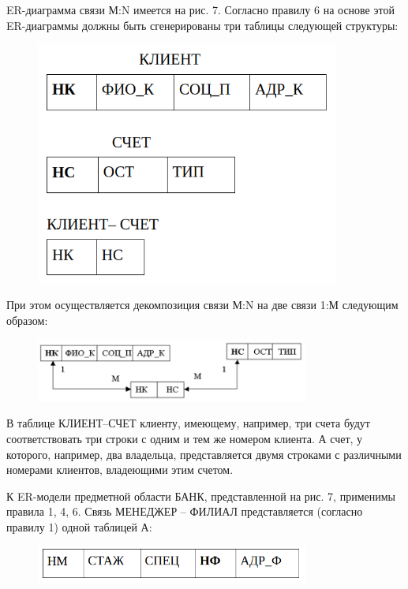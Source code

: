 \begin{enumerate}
    ER-диаграмма связи М:N имеется на рис. 7. Согласно правилу 6 на основе этой ER-диаграммы должны быть
    сгенерированы три таблицы следующей структуры:

    \begin{figure}[H]
        \centering
        \includegraphics[width=100mm]{assets/security/pic13.png}
        \label{fig:mesh15}
    \end{figure}

    При этом осуществляется декомпозиция связи М:N на две связи 1:М следующим образом:

    \begin{figure}[H]
        \centering
        \includegraphics[width=0.8\textwidth]{assets/security/pic14.png}
        \label{fig:mesh16}
    \end{figure}

    В таблице КЛИЕНТ–СЧЕТ клиенту, имеющему, например, три счета будут соответствовать три строки
    с одним и тем же номером клиента. А счет, у которого, например, два владельца, представляется двумя
    строками с различными номерами клиентов, владеющими этим счетом.

    К ER-модели предметной области БАНК, представленной на рис. 7, применимы правила 1, 4, 6. Связь МЕНЕДЖЕР
    – ФИЛИАЛ представляется (согласно правилу 1) одной таблицей А:

    \begin{figure}[H]
        \centering
        \includegraphics[width=0.8\textwidth]{assets/security/pic15.png}
        \label{fig:mesh17}
    \end{figure}


\end{enumerate}
